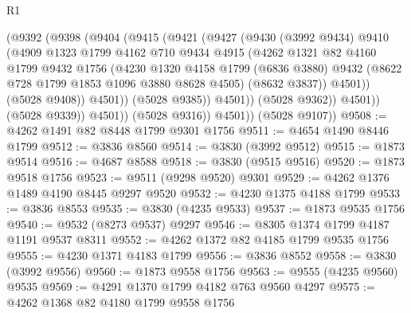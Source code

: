 \begin{lexlean}{R1}
\begin{coremodule}
                      (@9392
                        (@9398
                          (@9404
                            (@9415
                              (@9421
                                (@9427
                                  (@9430
                                    (@3992 @9434)
                                    @9410
                                    (@4909
                                      @1323
                                      @1799
                                      @4162
                                      @710
                                      @9434
                                      @4915
                                      (@4262
                                        @1321
                                        @82
                                        @4160
                                        @1799
                                        @9432
                                        @1756
                                        (@4230
                                          @1320
                                          @4158
                                          @1799
                                          (@6836 @3880)
                                          @9432
                                          (@8622 @728 @1799 @1853 @1096 @3880 @8628 @4505)
                                          (@8632 @3837))
                                        @4501))
                                    (@5028 @9408))
                                  @4501))
                              (@5028 @9385))
                            @4501))
                        (@5028 @9362))
                      @4501))
                  (@5028 @9339))
                @4501))
            (@5028 @9316))
          @4501))
      (@5028 @9107))
@9508 := @4262 @1491 @82 @8448 @1799 @9301 @1756
@9511 := @4654 @1490 @8446 @1799
@9512 := @3836 @8560
@9514 := @3830 (@3992 @9512)
@9515 := @1873 @9514
@9516 := @4687 @8588
@9518 := @3830 (@9515 @9516)
@9520 := @1873 @9518 @1756
@9523 := @9511 (@9298 @9520) @9301
@9529 := @4262 @1376 @1489 @4190 @8445 @9297 @9520
@9532 := @4230 @1375 @4188 @1799
@9533 := @3836 @8553
@9535 := @3830 (@4235 @9533)
@9537 := @1873 @9535 @1756
@9540 := @9532 (@8273 @9537) @9297
@9546 := @8305 @1374 @1799 @4187 @1191 @9537 @8311
@9552 := @4262 @1372 @82 @4185 @1799 @9535 @1756
@9555 := @4230 @1371 @4183 @1799
@9556 := @3836 @8552
@9558 := @3830 (@3992 @9556)
@9560 := @1873 @9558 @1756
@9563 := @9555 (@4235 @9560) @9535
@9569 := @4291 @1370 @1799 @4182 @763 @9560 @4297
@9575 := @4262 @1368 @82 @4180 @1799 @9558 @1756

\end{coremodule}
\end{lexlean}
